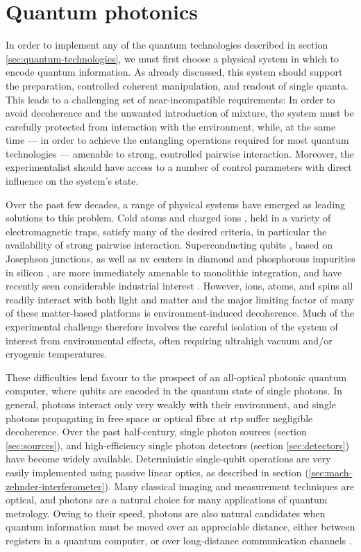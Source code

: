 \section{Quantum photonics}
\label{sec:quantum-photonics}
In order to implement any of the quantum technologies described in section \ref{sec:quantum-technologies}, we must first choose a physical system in which to encode quantum information. As already discussed, this system should support the preparation, controlled coherent manipulation, and readout of single quanta. This leads to a challenging set of near-incompatible requirements: In order to avoid decoherence and the unwanted introduction of mixture, the system must be carefully protected from interaction with the environment, while, at the same time --- 
in order to achieve the entangling operations required for most quantum technologies ---
amenable to strong, controlled pairwise interaction. Moreover, the experimentalist should have access to a number of control parameters with direct influence on the system's state.

Over the past few decades, a range of physical systems have emerged as leading solutions to this problem. Cold atoms \cite{Blatt2008} and charged ions \cite{Lanyon2013}, held in a variety of electromagnetic traps, satisfy many of the desired criteria, in particular the availability of strong pairwise interaction. Superconducting qubits \cite{Devoret2013}, based on Josephson junctions, as well as \gls{nv} centers in diamond \cite{Robledo2011} and phosphorous impurities in silicon \cite{Kane1998}, are more immediately amenable to monolithic integration, and have recently seen considerable industrial interest \cite{Ronnow2014}.  However, ions, atoms, and spins all readily interact with both light and matter and the major limiting factor of many of these matter-based platforms is environment-induced decoherence. Much of the experimental challenge therefore involves the careful isolation of the system of interest from environmental effects, often requiring ultrahigh vacuum and/or cryogenic temperatures.

These difficulties lend favour to the prospect of an all-optical photonic quantum computer, where qubits are encoded in the quantum state of single photons.
In general, photons interact only very weakly with their environment, and single photons propagating in free space or optical fibre at \gls{rtp} suffer negligible decoherence. Over the past half-century, single photon sources (section \ref{sec:sources}), and high-efficiency single photon detectors (section \ref{sec:detectors}) have become widely available. Deterministic single-qubit operations are very easily implemented using passive linear optics, as described in section (\ref{sec:mach-zehnder-interferometer}). Many classical imaging and measurement techniques are optical, and photons are a natural choice for many applications of quantum metrology. Owing to their speed, photons are also natural candidates when quantum information must be moved over an appreciable distance, either between registers in a quantum computer, or over long-distance communication channels \cite{URen2004}.


